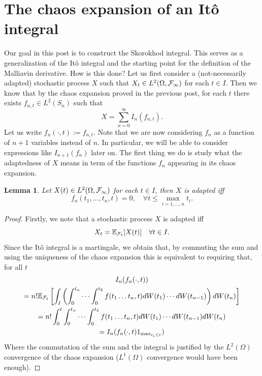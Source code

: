 \documentclass[12pt]{article}
\newtheorem{lemma}{Lemma}
\begin{document}
\section{The chaos expansion of an Itô integral}
Our goal in this post is to construct the Skorokhod integral. This serves as a generalization of the Itô integral and the starting point for the definition of the Malliavin derivative. How is this done? Let us first consider a (not-necessarily adapted) stochastic process $X$ such that $X_t\in L^2(\Omega,\mathcal{F}_\infty)$ for each $t \in I$. Then we know that by the chaos expansion proved in the previous post, for each $t$ there exists  $f_{n,t}\in L^2(S_n)$ such that
\begin{equation*}
	X=\sum_{n=0}^{\infty} I_n(f_{n,t}).
\end{equation*}
Let us write $f_{n}(\cdot,t):=f_{n,t}$. Note that we are now considering $f_n$ as a function of $n+1$ variables instead of  $n$. In particular, we will be able to consider expressions like  $I_{n+1}(f_n)$ later on. The first thing we do is study what the adaptedness of $X$ means in term of the functions $f_n$ appearing in its chaos expansion.
\begin{lemma}
	Let $X(t) \in L^2(\Omega,\mathcal{F}_\infty)$ for each $t \in  I$, then $X$ is adapted iff
	\begin{equation*}
		f_n(t_1,\ldots,t_n,t)=0,\quad\forall t\leq\max_{i=1,\ldots,n} t_i .
	\end{equation*}
\end{lemma}
\begin{proof}
	Firstly, we note that a stochastic process $X$ is adapted iff $$X_t=\mathbb{E}_{\mathcal{F}_t}[X(t)]\quad\forall t\in I.$$ Since the Itô integral is a martingale, we obtain that, by commuting the sum and using the uniqueness of the chaos expansion this is equivalent to requiring that, for all $t$
	\begin{multline*}
		I_n(f_n(\cdot,t))\\=	n!\mathbb{E}_{\mathcal{F}_t} \left[\int_{I} \left( \int_{0}^{t_n}\cdots \int_{0}^{t_2}f(t_1\ldots t_n,t) dW(t_1) \cdots dW(t_{n-1}) \right)dW(t_n)\right]\\
		=n!\int_{0}^t \int_{0}^{t_n}\cdots \int_{0}^{t_2}f(t_1\ldots t_n,t) dW(t_1) \cdots dW(t_{n-1})dW(t_n)\\= I_n(f_n(\cdot,t) 1_{\max_{t_i\leq t}})
	\end{multline*}
	Where the commutation of the sum and the integral is justified by the $L^2(\Omega)$ convergence of the chaos expansion ($L^1(\Omega)$ convergence would have been enough).
\end{proof}
\end{document}

